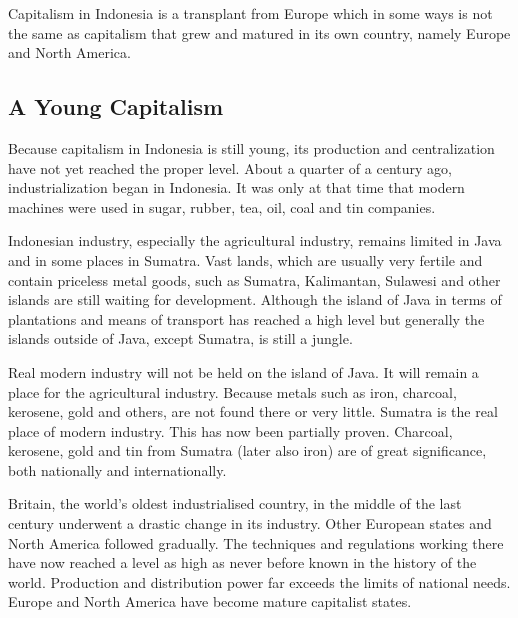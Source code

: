 Capitalism in Indonesia is a transplant from Europe which in 
some ways is not the same as capitalism that grew and matured in its own country, namely Europe and North America.\nline

\subsection{A Young Capitalism}

Because capitalism in Indonesia is still young, its production and centralization 
have not yet reached the proper level. About a quarter of a century ago, industrialization 
began in Indonesia. It was only at that time that modern machines were used in sugar, rubber, tea, oil, coal and tin companies.\nline

Indonesian industry, especially the agricultural industry, remains limited 
in Java and in some places in Sumatra. Vast lands, which are usually very 
fertile and contain priceless metal goods, such as Sumatra, Kalimantan, 
Sulawesi and other islands are still waiting for development. Although 
the island of Java in terms of plantations and means of transport has 
reached a high level but generally the islands outside of Java, except Sumatra, is still a jungle.\nline

Real modern industry will not be held on the island of Java. It will remain 
a place for the agricultural industry. Because metals such as iron, charcoal, 
kerosene, gold and others, are not found there or very little. Sumatra is 
the real place of modern industry. This has now been partially proven. Charcoal, 
kerosene, gold and tin from Sumatra (later also iron) are of great significance, both nationally and internationally.\nline

Britain, the world's oldest industrialised country, in the middle of the last 
century underwent a drastic change in its industry. Other European states and 
North America followed gradually. The techniques and regulations working there 
have now reached a level as high as never before known in the history of the world. 
Production and distribution power far exceeds the limits of national needs. Europe 
and North America have become mature capitalist states.\nline

